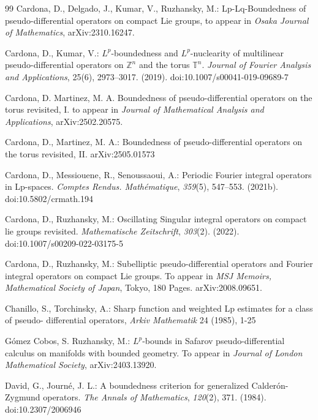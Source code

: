 \documentclass[12pt, reqno]{amsart}
\theoremstyle{definition}
\theoremstyle{remark}
\numberwithin{equation}{section}
\begin{document}
\begin{thebibliography}{99}
Cardona, D., Delgado, J., Kumar, V.,  Ruzhansky, M.: Lp-Lq-Boundedness of pseudo-differential operators on compact Lie groups, to appear in \textit{Osaka Journal of  Mathematics}, arXiv:2310.16247.

Cardona, D.,  Kumar, V.: $L^p$-boundedness and $L^p$-nuclearity of multilinear pseudo-differential operators on ${\mathbb {Z}}^n$ and the torus ${\mathbb {T}}^n$. \textit{Journal of Fourier Analysis and Applications}, 25(6), 2973–3017. (2019). doi:10.1007/s00041-019-09689-7 

Cardona, D.  Martinez, M. A. Boundedness of pseudo-differential operators on the torus revisited, I. to appear in \textit{Journal of Mathematical Analysis and Applications},  arXiv:2502.20575.

Cardona, D., Martinez, M. A.: Boundedness of pseudo-differential operators on the torus revisited, II.  arXiv:2505.01573

Cardona, D., Messiouene, R.,  Senoussaoui, A.: Periodic Fourier integral operators in Lp-spaces. \textit{Comptes Rendus. Mathématique}, \textit{359}(5), 547–553. (2021b). doi:10.5802/crmath.194 


Cardona, D.,  Ruzhansky, M.: Oscillating Singular integral operators on compact lie groups revisited. \textit{Mathematische Zeitschrift}, \textit{303}(2). (2022). doi:10.1007/s00209-022-03175-5 


Cardona, D.,  Ruzhansky, M.: Subelliptic pseudo-differential operators and Fourier integral operators on compact Lie groups. To appear in \textit{MSJ Memoirs, Mathematical Society of Japan}, Tokyo, 180 Pages. arXiv:2008.09651.

Chanillo, S., Torchinsky, A.: Sharp function and weighted Lp estimates for a class of pseudo-
differential operators, \textit{Arkiv Mathematik} 24 (1985), 1-25

G\'omez Cobos, S.  Ruzhansky, M.:
$L^p$-bounds in Safarov pseudo-differential calculus on manifolds with bounded geometry. To appear in \textit{Journal of London Mathematical Society},  arXiv:2403.13920. 

David, G.,  Journ\'e, J. L.: A boundedness criterion for generalized Calder\'on-Zygmund operators. \textit{The Annals of Mathematics}, \textit{120}(2), 371. (1984). doi:10.2307/2006946 



\end{thebibliography}
\end{document}

